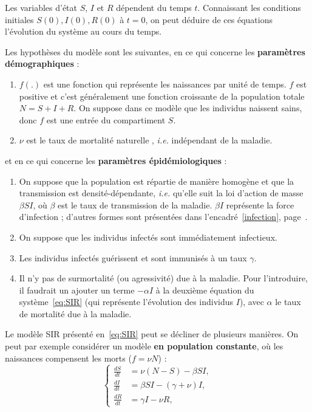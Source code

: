 	Les variables d'état $S$, $I$ et $R$ dépendent du temps $t$. 
Connaissant les conditions initiales $S(0), I(0), R(0)$ à $t=0$, on peut déduire de ces équations l'évolution du système au cours du temps.
	
	Les hypothèses du modèle sont les  suivantes, en ce qui concerne les \textbf{paramètres démographiques} : 
\begin{enumerate}[label=\roman*.]
\item  $f(.)$ est une fonction qui représente les naissances par unité de temps. $f$ est positive et c'est généralement une fonction croissante de la population totale $N=S+I+R$. On suppose dans ce modèle que les individus naissent sains, donc $f$ est une entrée du compartiment $S$.
\item $\nu$ est le taux  de mortalité \og naturelle \fg{}, \textit{i.e.} indépendant de la maladie.
\end{enumerate}
et en ce qui concerne les \textbf{paramètres épidémiologiques} :
\begin{enumerate}[label=\roman*.,resume]
\item On suppose que la population est répartie de manière homogène et que la transmission est densité-dépendante, \textit{i.e.} qu'elle suit la loi d’action de masse $\beta S I$, où $\beta$ est le taux de transmission de la maladie. $\beta I$ représente la force d'infection ; d'autres formes sont présentées dans l'encadré~\ref{infection}, page~\pageref{infection}.
\item On suppose que les individus infectés sont immédiatement infectieux.
\item Les individus infectés guérissent et sont immunisés à un taux $\gamma$. 
\item Il n'y pas de surmortalité (ou agressivité) due à la maladie. Pour l'introduire, il faudrait un ajouter un  terme $- \alpha I$ à la deuxième équation du système~\eqref{eq:SIR} (qui représente l'évolution des individus $I$),
 avec $\alpha$  le taux de mortalité due à la maladie.
\end{enumerate}
	
	
	Le modèle SIR présenté en~\eqref{eq:SIR} peut se décliner de plusieurs manières. On peut par exemple considérer un modèle \textbf{en population constante}, où les naissances compensent les morts ($f=\nu N$) :
	\begin{equation}
	   \left\{
	     \begin{aligned}
	       \frac{dS}{dt} &= \nu (N - S) - \beta SI,\\
	       \frac{dI}{dt} &= \beta SI - (\gamma +\nu) I, \\         
	       \frac{dR}{dt} &= \gamma I- \nu R, 
	     \end{aligned}
	   \right.
	   \label{eq:SIR-Ncst}
	\end{equation}
	
